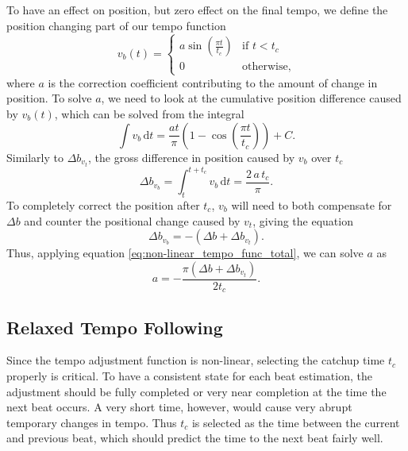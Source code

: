To have an effect on position,
but zero effect on the final tempo,
we define the position changing part of our tempo function
\begin{equation}
v_b(t) =
\begin{cases}
a \sin \left( \frac{\pi t}{t_c} \right) & \text{if } t < t_c \\
0 & \text{otherwise},
\end{cases}
\end{equation}
where $a$ is the correction coefficient
contributing to the amount of change in position.
To solve $a$, we need to look at the
cumulative position difference caused by $v_b(t)$,
which can be solved from the integral
\begin{equation}
\int v_b \, \mathrm{d}t =
\frac{a t}{\pi} \left( 1 - \cos \left( \frac{\pi t}{t_c} \right) \right) + C.
\end{equation}
Similarly to $\Delta b_{v_t}$,
the gross difference in position caused by $v_b$ over $t_c$
\begin{equation}
\label{eq:non-linear_tempo_func_total}
\Delta b_{v_b} = \int_t^{t + t_c} v_b \, \mathrm{d}t =
\frac{2 \, a \, t_c}{\pi}.
\end{equation}
To completely correct the position after $t_c$,
$v_b$ will need to both compensate for
$\Delta b$ and counter the positional change caused by $v_t$,
giving the equation
\begin{equation}
\Delta b_{v_b} = - \left( \Delta b + \Delta b_{v_t} \right) .
\end{equation}
Thus, applying equation \ref{eq:non-linear_tempo_func_total},
we can solve $a$ as
\begin{equation}
\label{eq:non_linear_coef}
a = - \frac{\pi \left( \Delta b + \Delta b_{v_t} \right)}{2 t_c}.
\end{equation}

\subsection{Relaxed Tempo Following}

Since the tempo adjustment function is non-linear,
selecting the catchup time $t_c$ properly is critical.
To have a consistent state for each beat estimation,
the adjustment should be fully completed
or very near completion
at the time the next beat occurs.
A very short time, however,
would cause very abrupt temporary changes in tempo.
Thus $t_c$ is selected as the time between
the current and previous beat,
which should predict the time to the next
beat fairly well.

